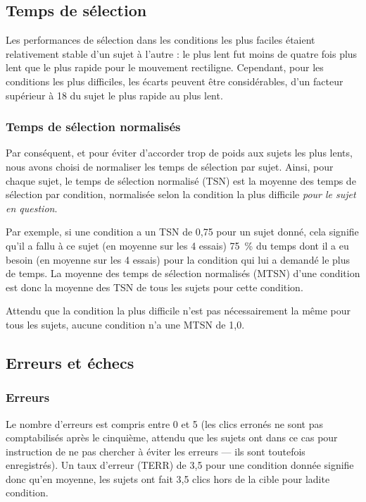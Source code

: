	\subsection{Temps de sélection}
	Les performances de sélection dans les conditions les plus faciles étaient relativement stable d'un sujet à l'autre : le plus lent fut moins de quatre fois plus lent que le plus rapide pour le mouvement rectiligne. Cependant, pour les conditions les plus difficiles, les écarts peuvent être considérables, d'un facteur supérieur à 18 du sujet le plus rapide au plus lent.
	
	\subsubsection{Temps de sélection normalisés}
	Par conséquent, et pour éviter d'accorder trop de poids aux sujets les plus lents, nous avons choisi de normaliser les temps de sélection par sujet. Ainsi, pour chaque sujet, le temps de sélection normalisé (TSN) est la moyenne des temps de sélection par condition, normalisée selon la condition la plus difficile \emph{pour le sujet en question}.
	
	Par exemple, si une condition a un TSN de 0,75 pour un sujet donné, cela signifie qu'il a fallu à ce sujet (en moyenne sur les 4 essais) 75~\%{} du temps dont il a eu besoin (en moyenne sur les 4 essais) pour la condition qui lui a demandé le plus de temps. La moyenne des temps de sélection normalisés (MTSN) d'une condition est donc la moyenne des TSN de tous les sujets pour cette condition.
	
	Attendu que la condition la plus difficile n'est pas nécessairement la même pour tous les sujets, aucune condition n'a une MTSN de 1,0.
	
	\subsection{Erreurs et échecs}
	\subsubsection{Erreurs}
	Le nombre d'erreurs est compris entre 0 et 5 (les clics erronés ne sont pas comptabilisés après le cinquième, attendu que les sujets ont dans ce cas pour instruction de ne pas chercher à éviter les erreurs --- ils sont toutefois enregistrés). Un taux d'erreur (TERR) de 3,5 pour une condition donnée signifie donc qu'en moyenne, les sujets ont fait 3,5 clics hors de la cible pour ladite condition.
	
